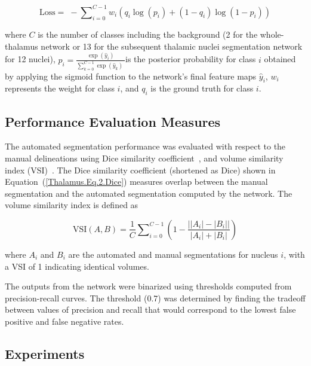 \begin{equation}
\label{Thalamus.Eq.3.Loss}
\text{Loss} = \;-\sum\nolimits_{i=0}^{C-1}w_i\left(q_i \log(p_i)+(1-q_i)\log(1-p_i)\right)
\end{equation}

where $C $ is the number of classes including the background (2 for the whole-thalamus network or 13 for the subsequent thalamic nuclei segmentation network for 12 nuclei), $p_i=\frac{\exp{({\widehat y}_i)}}{\sum_{k=0}^{C-1}\exp{({\widehat y}_k)}\;} $is the posterior probability for class $i $ obtained by applying the sigmoid function to the network's final feature maps ${\widehat y}_i $, $w_i $ represents the weight for class $i $, and $q_i $ is the ground truth for class $i $.

\subsection{Performance Evaluation Measures}
The automated segmentation performance was evaluated with respect to the manual delineations using Dice similarity coefficient~\cite{1921968:27964357}, and volume similarity index (VSI)~\cite{1921968:27964332}. The Dice similarity coefficient (shortened as Dice) shown in Equation~(\ref{Thalamus.Eq.2.Dice})  measures overlap between the manual segmentation and the automated segmentation computed by the network. The volume similarity index is defined as

\begin{equation}
\label{Thalamus.Eq.4.VSI}
\text{VSI}(A,B) = \frac1C\sum\nolimits_{i=0}^{C-1}\left(1-\frac{\left\vert \left\vert A_i\right\vert-\left\vert B_i\right\vert\right\vert}{\left\vert A_i\right\vert+\left\vert B_i\right\vert}\right)
\end{equation}

where $A_i $ and $B_i $ are the automated and manual segmentations for nucleus $i $, with a VSI of 1 indicating identical volumes.

The outputs from the network were binarized using thresholds computed from precision-recall curves. The threshold (0.7) was determined by finding the tradeoff between values of precision and recall that would correspond to the lowest false positive and false negative rates.

\subsection{Experiments}


